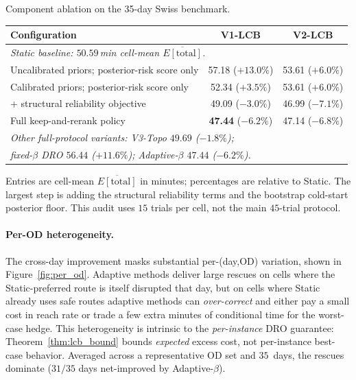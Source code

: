 \documentclass[opre,dblanonrev]{informs4}
\begin{document}
\begin{table}
\TABLE
{Component ablation on the 35-day Swiss benchmark.\label{tab:swiss_ablation}}
{\scriptsize\setlength{\tabcolsep}{3pt}\begin{tabular}{l cc}
\toprule
Configuration             & V1-LCB & V2-LCB \\
\midrule
\multicolumn{3}{l}{\emph{Static baseline: $50.59$\,min cell-mean $\overline{E[\mathrm{total}]}$.}} \\
Uncalibrated priors; posterior-risk score only
                          & 57.18 ($+13.0\%$) & 53.61 ($+6.0\%$) \\
Calibrated priors; posterior-risk score only
                          & 52.34 ($+3.5\%$)  & 53.61 ($+6.0\%$) \\
+ structural reliability objective
                          & 49.09 ($-3.0\%$)  & 46.99 ($-7.1\%$) \\
Full keep-and-rerank policy
                          & \textbf{47.44} ($\bm{-6.2\%}$) & 47.14 ($-6.8\%$) \\
\midrule
\multicolumn{3}{l}{\emph{Other full-protocol variants: V3-Topo $49.69$ ($-1.8\%$);}} \\
\multicolumn{3}{l}{\emph{fixed-$\beta$ DRO $56.44$ ($+11.6\%$); Adaptive-$\beta$ $47.44$ ($-6.2\%$).}} \\
\bottomrule
\end{tabular}}
{Entries are cell-mean $\overline{E[\mathrm{total}]}$ in
minutes; percentages are relative to Static. The largest step is
adding the structural reliability terms and the bootstrap cold-start
posterior floor. This audit uses $15$ trials per cell, not the main
$45$-trial protocol.}
\end{table}

\FloatBarrier
\paragraph{Per-OD heterogeneity.}
The cross-day improvement masks substantial per-(day,OD) variation,
shown in Figure~\ref{fig:per_od}. Adaptive methods deliver large
rescues on cells where the Static-preferred route is itself disrupted
that day, but on cells where Static already uses safe routes adaptive
methods can \emph{over-correct} and either pay a small cost in reach
rate or trade a few extra minutes of conditional time for the
worst-case hedge. This heterogeneity is intrinsic to the
\emph{per-instance} DRO guarantee: Theorem~\ref{thm:lcb_bound} bounds
\emph{expected} excess cost, not per-instance best-case behavior.
Averaged across a representative OD set and $35$~days, the rescues
dominate ($31/35$ days net-improved by Adaptive-$\beta$).
\end{document}
